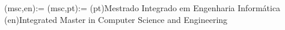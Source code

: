 












\degreenameprefix(msc,en):={}
\degreenameprefix(msc,pt):={}
\ntdegreename(pt){Mestrado Integrado em Engenharia Informática}
\ntdegreename(en){Integrated Master in Computer Science and Engineering}






